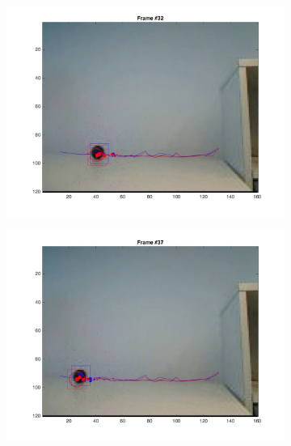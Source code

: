 \documentclass{ethz_report}
\begin{document}
\begin{figure}[h]
\begin{subfigure}[b]{.25\textwidth}
        \includegraphics[width=1\linewidth]{images/video3_bins_high_31}
    \end{subfigure}%
    \begin{subfigure}[b]{.25\textwidth}
        \centering
        \includegraphics[width=1\linewidth]{images/video3_bins_high_36}
    \end{subfigure}
    \begin{subfigure}[b]{.25\textwidth}
        \centering

\end{subfigure}
\end{figure}
\end{document}
